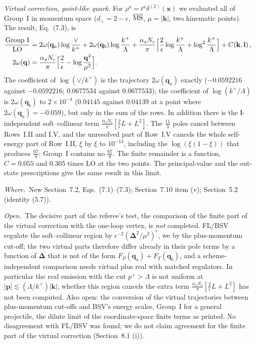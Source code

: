\documentclass[a4paper,11pt]{article}
\def\v#1{\mathbf{#1}}
\newcommand{\MS}{\overline{\rm MS}}
\newcommand{\where}{\par\noindent\emph{Where.}\ }
\newcommand{\open}{\par\noindent\emph{Open.}\ }
\begin{document}
\emph{Virtual correction, point-like quark.} For $\rho^a=t^a\delta^{(2)}(\v x)$ we evaluated all of Group~I in momentum space ($d_\perp=2-\epsilon$, $\MS$, $\mu=|\v k|$, two kinematic points). The result, Eq.~(7.3), is
\begin{align*}
\frac{\text{Group I}}{\rm LO}&=2\omega(\v q_a)\log\frac{\vee}{k^+}+2\omega(\v q_b)\log\frac{k^+}{\Lambda}+\frac{\alpha_sN_c}{\pi}\Big[\frac2\epsilon\log\frac{k^+}{\Lambda}+\log^2\frac{k^+}{\Lambda}\Big]+C(\v k,\v l)\,,\\
2\omega(\v q)&=\frac{\alpha_sN_c}{\pi}\Big[\frac2\epsilon-\log\frac{\v q^2}{\mu^2}\Big].
\end{align*}
The coefficient of $\log(\vee/k^+)$ is the trajectory $2\omega(\v q_a)$ exactly ($-0.0592216$ against $-0.0592216$; $0.0677534$ against $0.0677533$); the coefficient of $\log(k^+/\Lambda)$ is $2\omega(\v q_b)$ to $2\times10^{-4}$ ($0.04145$ against $0.04139$ at a point where $2\omega(\v q_a)=-0.059$), but only in the sum of the rows. In addition there is the $\v l$-independent soft--collinear term $\frac{\alpha_sN_c}{\pi}[\frac2\epsilon L+L^2]$. The $\frac{11}{3}$ poles cancel between Rows~I.II and I.V, and the unresolved part of Row~I.V cancels the whole self-energy part of Row~I.II, $\xi$ by $\xi$ to $10^{-13}$, including the $\log(\xi(1-\xi))$ that produces $\frac{67}{9}$: Group~I contains no $\frac{67}{9}$. The finite remainder is a function, $C=0.055$ and $0.305$ times LO at the two points. The principal-value and the out-state prescriptions give the same result in this limit.
\where New Section~7.2, Eqs.~(7.1)--(7.3); Section~7.10 item (v); Section~5.2 (identity (5.7)).
\open The decisive part of the referee's test, the comparison of the finite part of the virtual correction with the one-loop vertex, is \emph{not} completed. FL/BSV regulate the soft--collinear region by $\epsilon^{-2}(\boldsymbol\Delta^2/\mu^2)^\epsilon$, we by the plus-momentum cut-off; the two virtual parts therefore differ already in their pole terms by a function of $\boldsymbol\Delta$ that is not of the form $F_P(\v q_a)+F_T(\v q_b)$, and a scheme-independent comparison needs virtual plus real with matched regulators. In particular the real emission with the cut $p^+>\Lambda$ is not uniform at $|\v p|\lesssim(\Lambda/k^+)|\v k|$; whether this region cancels the extra term $\frac{\alpha_sN_c}{\pi}[\frac2\epsilon L+L^2]$ has not been computed. Also open: the conversion of the virtual trajectories between plus-momentum cut-offs and BSV's energy scales, Group~I for a general projectile, the dilute limit of the coordinate-space finite terms as printed. No disagreement with FL/BSV was found; we do not claim agreement for the finite part of the virtual correction (Section~8.1 (i)).
\end{document}
